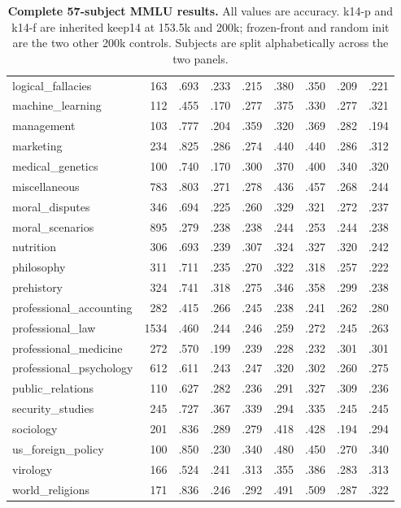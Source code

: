 \begin{table}[t]
\begin{minipage}[t]{.495\textwidth}
{\begin{tabular}{@{}lrrrrrrrr@{}}
logical\_fallacies & 163 & .693 & .233 & .215 & .380 & .350 & .209 & .221 \\
machine\_learning & 112 & .455 & .170 & .277 & .375 & .330 & .277 & .321 \\
management & 103 & .777 & .204 & .359 & .320 & .369 & .282 & .194 \\
marketing & 234 & .825 & .286 & .274 & .440 & .440 & .286 & .312 \\
medical\_genetics & 100 & .740 & .170 & .300 & .370 & .400 & .340 & .320 \\
miscellaneous & 783 & .803 & .271 & .278 & .436 & .457 & .268 & .244 \\
moral\_disputes & 346 & .694 & .225 & .260 & .329 & .321 & .272 & .237 \\
moral\_scenarios & 895 & .279 & .238 & .238 & .244 & .253 & .244 & .238 \\
nutrition & 306 & .693 & .239 & .307 & .324 & .327 & .320 & .242 \\
philosophy & 311 & .711 & .235 & .270 & .322 & .318 & .257 & .222 \\
prehistory & 324 & .741 & .318 & .275 & .346 & .358 & .299 & .238 \\
professional\_accounting & 282 & .415 & .266 & .245 & .238 & .241 & .262 & .280 \\
professional\_law & 1534 & .460 & .244 & .246 & .259 & .272 & .245 & .263 \\
professional\_medicine & 272 & .570 & .199 & .239 & .228 & .232 & .301 & .301 \\
professional\_psychology & 612 & .611 & .243 & .247 & .320 & .302 & .260 & .275 \\
public\_relations & 110 & .627 & .282 & .236 & .291 & .327 & .309 & .236 \\
security\_studies & 245 & .727 & .367 & .339 & .294 & .335 & .245 & .245 \\
sociology & 201 & .836 & .289 & .279 & .418 & .428 & .194 & .294 \\
us\_foreign\_policy & 100 & .850 & .230 & .340 & .480 & .450 & .270 & .340 \\
virology & 166 & .524 & .241 & .313 & .355 & .386 & .283 & .313 \\
world\_religions & 171 & .836 & .246 & .292 & .491 & .509 & .287 & .322 \\
\bottomrule
\end{tabular}%
}
\end{minipage}
\caption{\textbf{Complete 57-subject MMLU results.} All values are accuracy. k14-p and k14-f are inherited keep14 at 153.5k and 200k; frozen-front and random init are the two other 200k controls. Subjects are split alphabetically across the two panels.}
\label{tab:app-mmlu-full}
\end{table}
